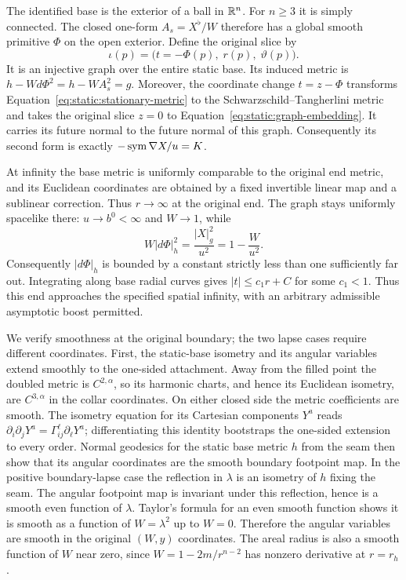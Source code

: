 The identified base is the exterior of a ball in $\mathbb R^n$.
For $n\geq3$ it is simply connected.  The closed one-form
$A_s=X^\flat/W$ therefore has a global smooth primitive $\Phi$
on the open exterior.  Define the original slice by
\begin{equation}\label{eq:static:graph-embedding}
 \iota(p)=\bigl(t=-\Phi(p),\;r(p),\;\vartheta(p)\bigr).
\end{equation}
It is an injective graph over the entire static base.  Its
induced metric is
$h-Wd\Phi^2=h-WA_s^2=g$.  Moreover, the coordinate change
$t=z-\Phi$ transforms Equation~\eqref{eq:static:stationary-metric}
to the Schwarzschild--Tangherlini metric and takes the original
slice $z=0$ to Equation~\eqref{eq:static:graph-embedding}.
It carries its future normal to the future normal of this graph.
Consequently its second form is exactly
$-\operatorname{sym}\nabla X/u=K$.

At infinity the base metric is uniformly comparable to the
original end metric, and its Euclidean coordinates are obtained
by a fixed invertible linear map and a sublinear correction.
Thus $r\to\infty$ at the original end.  The graph stays
uniformly spacelike there: $u\to b^0<\infty$ and $W\to1$, while
\[
 W|d\Phi|_h^2=\frac{|X|_g^2}{u^2}=1-\frac W{u^2}.
\]
Consequently $|d\Phi|_h$ is bounded by a constant strictly less
than one sufficiently far out.  Integrating along base radial
curves gives $|t|\leq c_1r+C$ for some $c_1<1$.
Thus this end approaches the specified spatial infinity,
with an arbitrary admissible asymptotic boost permitted.

We verify smoothness at the original boundary; the two lapse
cases require different coordinates.  First, the static-base
isometry and its angular variables extend smoothly to the
one-sided attachment.  Away from the filled point the doubled
metric is $C^{2,\alpha}$, so its harmonic charts, and hence its
Euclidean isometry, are $C^{3,\alpha}$ in the collar coordinates.
On either closed side the metric coefficients are smooth.  The
isometry equation for its Cartesian components $Y^a$ reads
$\partial_i\partial_jY^a=\Gamma_{ij}^\ell\partial_\ell Y^a$;
differentiating this identity bootstraps the one-sided extension
to every order.  Normal geodesics for the static base metric $h$
from the seam then show that
its angular coordinates are the smooth boundary footpoint map.
In the positive boundary-lapse case the reflection in
$\lambda$ is an isometry of $h$ fixing the seam.  The angular
footpoint map is invariant under this reflection, hence is a
smooth even function of $\lambda$.  Taylor's formula for an
even smooth function shows it is smooth as a function of
$W=\lambda^2$ up to $W=0$.  Therefore the angular variables
are smooth in the original $(W,y)$ coordinates.  The areal
radius is also a smooth function of $W$ near zero, since
$W=1-2m/r^{n-2}$ has nonzero derivative at $r=r_h$.


